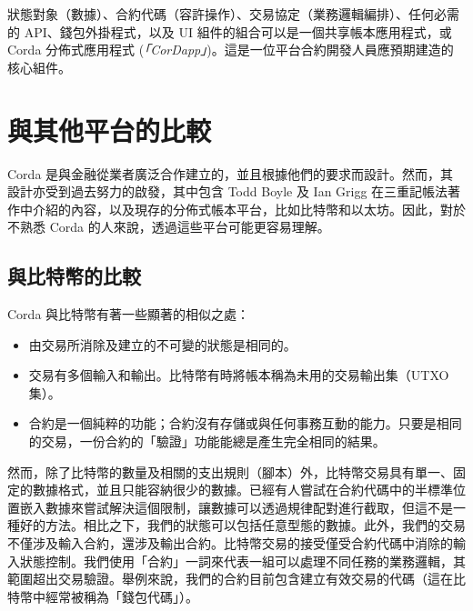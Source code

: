 ﻿\documentclass{article}
\begin{document}
狀態對象（數據）、合約代碼（容許操作）、交易協定（業務邏輯編排）、任何必需的 API、錢包外掛程式，以及 UI 組件的組合可以是一個共享帳本應用程式，或 Corda 分佈式應用程式 (\textit{「CorDapp」})。這是一位平台合約開發人員應預期建造的核心組件。 



\section{與其他平台的比較}
Corda 是與金融從業者廣泛合作建立的，並且根據他們的要求而設計。然而，其設計亦受到過去努力的啟發，其中包含 Todd Boyle 及 Ian Grigg 在三重記帳法\cite{Triple}著作中介紹的內容，以及現存的分佈式帳本平台，比如比特幣\cite{Bitcoin}和以太坊。因此，對於不熟悉 Corda 的人來說，透過這些平台可能更容易理解。 

\subsection{與比特幣的比較}
Corda 與比特幣有著一些顯著的相似之處： 
\begin{itemize}
\item{由交易所消除及建立的不可變的狀態是相同的。}
\item{交易有多個輸入和輸出。比特幣有時將帳本稱為未用的交易輸出集（UTXO 集）。}
\item{合約是一個純粹的功能；合約沒有存儲或與任何事務互動的能力。只要是相同的交易，一份合約的「驗證」功能能總是產生完全相同的結果。}
\end{itemize}

然而，除了比特幣的數量及相關的支出規則（腳本）外，比特幣交易具有單一、固定的數據格式，並且只能容納很少的數據。已經有人嘗試在合約代碼中的半標準位置嵌入數據來嘗試解決這個限制，讓數據可以透過規律配對進行截取，但這不是一種好的方法。相比之下，我們的狀態可以包括任意型態的數據。此外，我們的交易不僅涉及輸入合約，還涉及輸出合約。比特幣交易的接受僅受合約代碼中消除的輸入狀態控制。我們使用「合約」一詞來代表一組可以處理不同任務的業務邏輯，其範圍超出交易驗證。舉例來說，我們的合約目前包含建立有效交易的代碼（這在比特幣中經常被稱為「錢包代碼」）。
\end{document}
